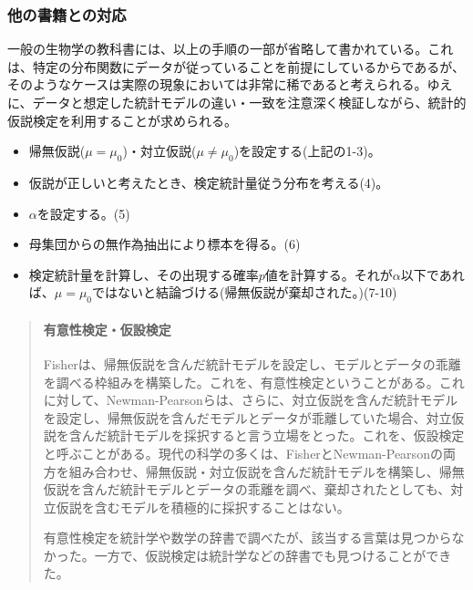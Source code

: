 \documentclass[a4paper,11pt,dvipdfmx]{jsarticle}
\begin{document}
\subsubsection{他の書籍との対応}
一般の生物学の教科書には、以上の手順の一部が省略して書かれている。これは、特定の分布関数にデータが従っていることを前提にしているからであるが、そのようなケースは実際の現象においては非常に稀であると考えられる。ゆえに、データと想定した統計モデルの違い・一致を注意深く検証しながら、統計的仮説検定を利用することが求められる。
\begin{framed}
    \begin{itemize}
        \item 帰無仮説($\mu = \mu_0$)・対立仮説($\mu\neq \mu_0$)を設定する(上記の1-3)。
        \item 仮説が正しいと考えたとき、検定統計量従う分布を考える(4)。
        \item $\alpha$を設定する。(5)
        \item 母集団からの無作為抽出により標本を得る。(6)
        \item 検定統計量を計算し、その出現する確率$p$値を計算する。それが$\alpha$以下であれば、$\mu=\mu_0$ではないと結論づける(帰無仮説が棄却された。)(7-10)
    \end{itemize}
\end{framed}



\begin{mybox}
    \begin{quotation}
    \paragraph{有意性検定・仮設検定\cite{鳥類学における統計学_2018}}
    Fisherは、帰無仮説を含んだ統計モデルを設定し、モデルとデータの乖離を調べる枠組みを構築した。これを、有意性検定ということがある。これに対して、Newman-Pearsonらは、さらに、対立仮説を含んだ統計モデルを設定し、帰無仮説を含んだモデルとデータが乖離していた場合、対立仮説を含んだ統計モデルを採択すると言う立場をとった。これを、仮設検定と呼ぶことがある。現代の科学の多くは、FisherとNewman-Pearsonの両方を組み合わせ、帰無仮説・対立仮説を含んだ統計モデルを構築し、帰無仮説を含んだ統計モデルとデータの乖離を調べ、棄却されたとしても、対立仮説を含むモデルを積極的に採択することはない。

    有意性検定を統計学\cite{upton2010統計学辞典,2009数理統計ハンドブック}や数学\cite{日本数学会2007岩波数学辞典}の辞書で調べたが、該当する言葉は見つからなかった。一方で、仮説検定は統計学\cite{upton2010統計学辞典,2009数理統計ハンドブック}などの辞書でも見つけることができた。
    \end{quotation}
\end{mybox}
\end{document}
